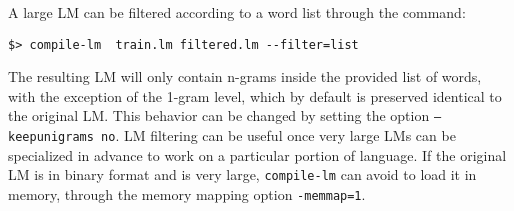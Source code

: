 A large LM can be filtered according to a word list through the command:

\begin{verbatim}
$> compile-lm  train.lm filtered.lm --filter=list
\end{verbatim}
The resulting LM will only contain n-grams inside the provided list of words,
with the exception of the 1-gram level, which by default is preserved identical
to the original LM. This behavior can be changed by setting the option 
{\tt --keepunigrams no}.  LM filtering can be useful once very large LMs can
be specialized in advance to work on a particular portion of language.
\noindent
If the original LM is in binary format and is very large, {\tt compile-lm} can avoid to load it in memory,
through the memory mapping option {\tt -memmap=1}.



